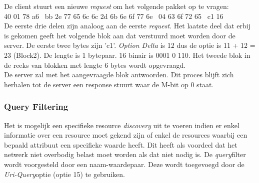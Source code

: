 \noindent
De client stuurt een nieuwe \textit{request} om het volgende pakket op te vragen:\\
40 01 78 a6 \textbar~bb 2e 77 65 6c 6c 2d 6b 6e 6f 77 6e \textbar~04 63 6f 72 65 \textbar~c1 16\\
De eerste drie delen zijn analoog aan de eerste \textit{request}. Het laatste deel dat erbij is gekomen geeft het volgende blok aan dat verstuurd moet worden door de server. De eerste twee bytes zijn 'c1'. \textit{Option Delta} is 12 dus de optie is 11 + 12 = 23 (Block2). De lengte is 1 bytepaar. 16 binair is 0001 0 110. Het tweede blok in de reeks van blokken met lengte 6 bytes wordt opgevraagd.\\

\noindent
De server zal met het aangevraagde blok antwoorden. Dit proces blijft zich herhalen tot de server een response stuurt waar de M-bit op 0 staat.

\subsubsection{Query Filtering}
Het is mogelijk een specifieke resource \textit{discovery} uit te voeren indien er enkel informatie over een resource moet gekend zijn of enkel de resources waarbij een bepaald attribuut een specifieke waarde heeft. Dit heeft als voordeel dat het netwerk niet overbodig belast moet worden als dat niet nodig is. De \textit{query}filter wordt voorgesteld door een naam-waardepaar. Deze wordt toegevoegd door de \textit{Uri-Query}optie (optie 15) te gebruiken.

